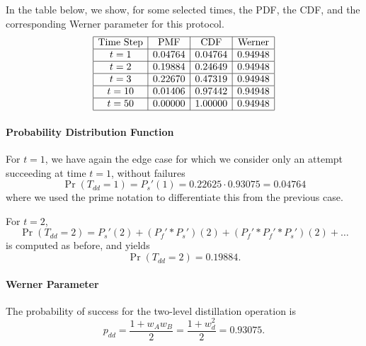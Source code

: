 \documentclass{masterthesis}
\begin{document}
In the table below, we show, for some selected times, the PDF, the CDF, and the corresponding Werner parameter for this protocol.
\begin{equation*}
    \begin{array}{|c|c|c|c|}
        \hline
        \text{Time Step} & \text{PMF} & \text{CDF} & \text{Werner} \\
        \hline
        t = 1 & 0.04764 & 0.04764 & 0.94948 \\
        \hline
        t = 2 & 0.19884 & 0.24649 & 0.94948 \\
        \hline
        t = 3 & 0.22670 & 0.47319 & 0.94948 \\
        \hline
        t = 10 & 0.01406 & 0.97442 & 0.94948 \\
        \hline
        t = 50 & 0.00000 & 1.00000 & 0.94948 \\
        \hline
    \end{array}
\end{equation*}

\paragraph*{Probability Distribution Function}

For $t = 1$, we have again the edge case for which we consider only an attempt succeeding at time $t=1$, without failures  
\begin{equation}
    \Pr(T_{dd} = 1) = P_s'(1) = 0.22625 \cdot 0.93075 = 0.04764 
\end{equation}
where we used the prime notation to differentiate this from the previous case. 

For $t = 2$,
\begin{equation}
    \Pr(T_{dd} = 2) = P_s'(2) + (P_f' \ast P_s')(2) + (P_f' \ast P_f' \ast P_s')(2) + \ldots
\end{equation}
is computed as before, and yields
\begin{equation}
    \Pr(T_{dd} = 2) = 0.19884 .
\end{equation}

\paragraph*{Werner Parameter}

The probability of success for the two-level distillation operation is
\begin{equation}
    p_{dd} = \frac{1 + w_A w_B}{2} = \frac{1 + w_d^2}{2} = 0.93075 .
\end{equation}
\end{document}
